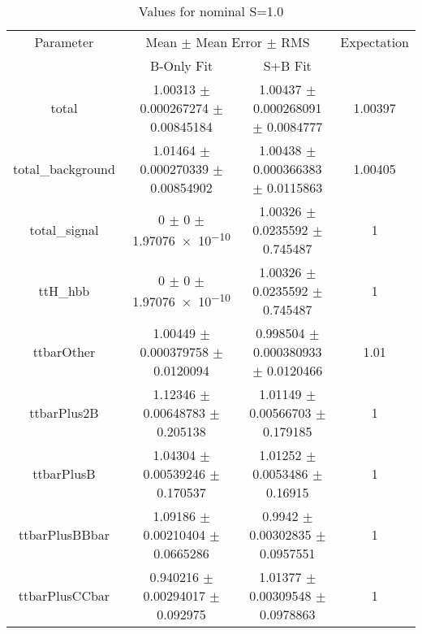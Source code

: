 \begin{table}
\centering
\caption{Values for nominal S=1.0}
\begin{tabular}{cccc}
\toprule
Parameter & \multicolumn{2}{c}{Mean $\pm$ Mean Error $\pm$ RMS} & Expectation\\
 & B-Only Fit & S+B Fit & \\
\midrule
total & \num{1.00313} $\pm$ \num{0.000267274} $\pm$ \num{0.00845184} & \num{1.00437} $\pm$ \num{0.000268091} $\pm$ \num{0.0084777} & \num{1.00397}\\
total\_background & \num{1.01464} $\pm$ \num{0.000270339} $\pm$ \num{0.00854902} & \num{1.00438} $\pm$ \num{0.000366383} $\pm$ \num{0.0115863} & \num{1.00405}\\
total\_signal & \num{0} $\pm$ \num{0} $\pm$ \num{1.97076e-10} & \num{1.00326} $\pm$ \num{0.0235592} $\pm$ \num{0.745487} & \num{1}\\
ttH\_hbb & \num{0} $\pm$ \num{0} $\pm$ \num{1.97076e-10} & \num{1.00326} $\pm$ \num{0.0235592} $\pm$ \num{0.745487} & \num{1}\\
ttbarOther & \num{1.00449} $\pm$ \num{0.000379758} $\pm$ \num{0.0120094} & \num{0.998504} $\pm$ \num{0.000380933} $\pm$ \num{0.0120466} & \num{1.01}\\
ttbarPlus2B & \num{1.12346} $\pm$ \num{0.00648783} $\pm$ \num{0.205138} & \num{1.01149} $\pm$ \num{0.00566703} $\pm$ \num{0.179185} & \num{1}\\
ttbarPlusB & \num{1.04304} $\pm$ \num{0.00539246} $\pm$ \num{0.170537} & \num{1.01252} $\pm$ \num{0.0053486} $\pm$ \num{0.16915} & \num{1}\\
ttbarPlusBBbar & \num{1.09186} $\pm$ \num{0.00210404} $\pm$ \num{0.0665286} & \num{0.9942} $\pm$ \num{0.00302835} $\pm$ \num{0.0957551} & \num{1}\\
ttbarPlusCCbar & \num{0.940216} $\pm$ \num{0.00294017} $\pm$ \num{0.092975} & \num{1.01377} $\pm$ \num{0.00309548} $\pm$ \num{0.0978863} & \num{1}\\
\bottomrule
\end{tabular}
\end{table}